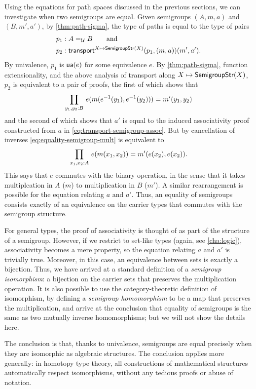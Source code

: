 Using the equations for path spaces discussed in the previous sections,
we can investigate when two semigroups are equal. Given semigroups
$(A,m,a)$ and $(B,m',a')$, by \cref{thm:path-sigma}, the type of paths
is equal to the type of pairs
\begin{align*}
p_1 &: A =_{\mathcal{U}} B \qquad\text{and}\\
p_2 &: \mathsf{transport}^{X \mapsto \mathsf{SemigroupStr}(X)}(p_1,(m,a)){(m',a')}.
\end{align*}
By univalence, $p_1$ is $\mathsf{ua}(e)$ for some equivalence $e$. By
\cref{thm:path-sigma}, function extensionality, and the above analysis of
transport along $X \mapsto \mathsf{SemigroupStr}(X)$, $p_2$ is equivalent to a pair
of proofs, the first of which shows that
\begin{equation*} \label{eq:equality-semigroup-mult}
\prd{y_1,y_2:B} e(m(\opp{e}(y_1), \opp{e}(y_2))) = m'(y_1,y_2)
\end{equation*}
and the second of which shows that $a'$ is equal to the induced
associativity proof constructed from $a$ in
\eqref{eq:transport-semigroup-assoc}.  But by cancellation of inverses
\eqref{eq:equality-semigroup-mult} is equivalent to
\[
\prd{x_1,x_2:A} e(m(x_1, x_2)) = m'(e(x_2),e(x_2)).
\]
This says that $e$ commutes with the binary operation, in the sense
that it takes multiplcation in $A$ ($m$) to multiplication in $B$
($m'$).  A similar rearrangement is possible for the equation relating
$a$ and $a'$.  Thus, an equality of semigroups consists exactly of an
equivalence on the carrier types that commutes with the semigroup
structure.  

For general types, the proof of associativity is thought of as part of
the structure of a semigroup.  However, if we restrict to set-like types
(again, see \cref{cha:logic}), associativity becomes a mere property, so the
equation relating $a$ and $a'$ is trivially true.  Moreover, in this
case, an equivalence between sets is exactly a bijection.  Thus, we have
arrived at a standard definition of a \emph{semigroup isomorphism}: a
bijection on the carrier sets that preserves the multiplication
operation.  It is also possible to use the category-theoretic definition
of isomorphism, by defining a \emph{semigroup homomorphism} to be a map
that preserves the multiplication, and arrive at the conclusion that equality of
semigroups is the same as two mutually inverse homomorphisms; but we
will not show the details here.

The conclusion is that, thanks to univalence, semigroups are equal
precisely when they are isomorphic as algebraic structures. The
conclusion applies more generally: in homotopy type theory, all constructions of
mathematical structures automatically respect isomorphisms, without any
tedious proofs or abuse of notation.

